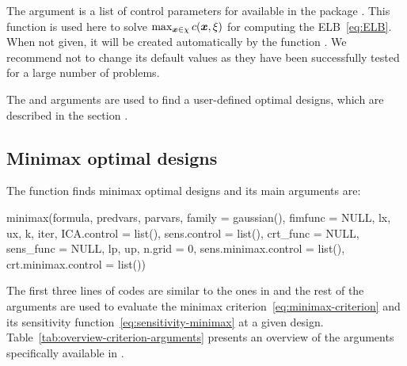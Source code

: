 The argument  is a list of control parameters for   available in the  package  \citep{johnson2014nlopt}. This function is used here to solve  $\max_{\boldsymbol{x} \in \chi}c(\boldsymbol{x}, \xi)$ for  computing the ELB~\eqref{eq:ELB}. When not given, it will be created automatically   by the function .
We recommend not to change its  default values
as they have been successfully tested for a large number of problems.

The  and  arguments are used to find a user-defined optimal designs, which are described in
the section .


\subsection{Minimax optimal designs}
\label{sec:minimax}
The   function finds minimax optimal designs and  its main  arguments are:
  \begin{example}
minimax(formula, predvars, parvars, family = gaussian(), fimfunc = NULL,
        lx, ux, k, iter, ICA.control = list(), sens.control = list(),
        crt_func = NULL, sens_func = NULL,
        lp, up, n.grid = 0,
        sens.minimax.control = list(), crt.minimax.control = list())
\end{example}
The first three lines of codes are similar to the ones in  and the  rest of the arguments are used  to evaluate the minimax criterion~\eqref{eq:minimax-criterion} and its sensitivity function~\eqref{eq:sensitivity-minimax} at a given design. Table~\ref{tab:overview-criterion-arguments} presents an overview of the  arguments specifically available in .


